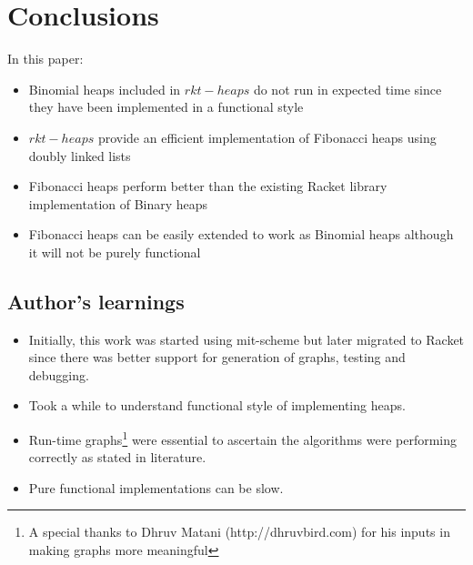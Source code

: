 \documentclass{llncs}
\begin{document}
\section{Conclusions}
In this paper:
\begin{itemize}
	\item Binomial heaps included in $rkt-heaps$ do not run in expected time since they have been implemented in a functional style
	\item $rkt-heaps$ provide an efficient implementation of Fibonacci heaps using doubly linked lists
	\item Fibonacci heaps perform better than the existing Racket library implementation of Binary heaps
	\item Fibonacci heaps can be easily extended to work as Binomial heaps although it will not be purely functional
\end{itemize}

\subsection{Author's learnings}
\begin{itemize}
	\item Initially, this work was started using mit-scheme but later migrated to Racket since there was better support for generation of graphs, testing and debugging.
	\item Took a while to understand functional style of implementing heaps.
	\item Run-time graphs\footnote{A special thanks to Dhruv Matani (http://dhruvbird.com) for his inputs in making graphs more meaningful} were essential to ascertain the algorithms were performing correctly as stated in literature.
	\item Pure functional implementations can be slow.   
\end{itemize}
		




\newpage
\appendix


\newpage
\end{document}
